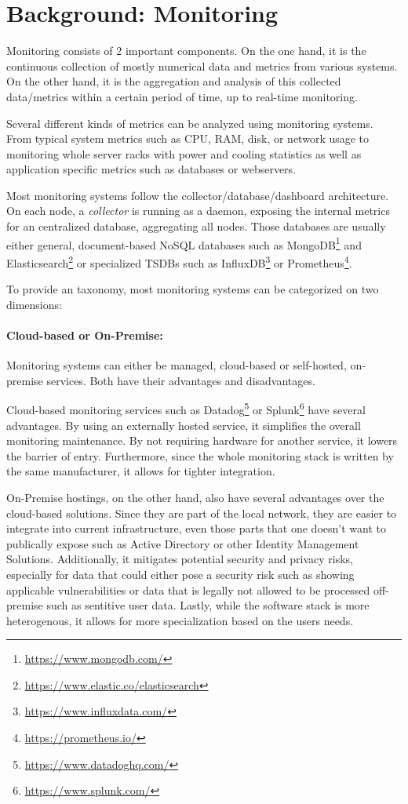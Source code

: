 \section{Background: Monitoring}
Monitoring consists of 2 important components. On the one hand, it is the continuous 
collection of mostly numerical data and metrics from various systems. On the other hand, it 
is the aggregation and analysis of this collected data/metrics within a certain period of 
time, up to real-time monitoring.

Several different kinds of metrics can be analyzed using monitoring systems. From typical
system metrics such as CPU, RAM, disk, or network usage to monitoring whole server racks
with power and cooling statistics as well as application specific metrics such as databases
or webservers.

Most monitoring systems follow the collector/database/dashboard architecture. On each node,
a \emph{collector} is running as a daemon, exposing the internal metrics for an centralized
database, aggregating all nodes. Those databases are usually either general, document-based
NoSQL databases such as MongoDB\footnote{\url{https://www.mongodb.com/}} and 
Elasticsearch\footnote{\url{https://www.elastic.co/elasticsearch}} or specialized \acp{TSDB}
such as InfluxDB\footnote{\url{https://www.influxdata.com/}} or Prometheus\footnote{
\url{https://prometheus.io/}}.

To provide an taxonomy, most monitoring systems can be categorized on two dimensions:

\paragraph{Cloud-based or On-Premise:} Monitoring systems can either be managed, cloud-based 
or self-hosted, on-premise services. Both have their advantages and disadvantages.

Cloud-based monitoring services such as Datadog\footnote{\url{https://www.datadoghq.com/}}
or Splunk\footnote{\url{https://www.splunk.com/}} have several advantages. By using an 
externally hosted service, it simplifies the overall monitoring maintenance. By not requiring
hardware for another service, it lowers the barrier of entry. Furthermore, since the whole
monitoring stack is written by the same manufacturer, it allows for tighter integration.

On-Premise hostings, on the other hand, also have several advantages over the cloud-based 
solutions. Since they are part of the local network, they are easier to integrate into current
infrastructure, even those parts that one doesn't want to publically expose such as Active 
Directory or other Identity Management Solutions. Additionally, it mitigates potential security and privacy risks, especially for data
that could either pose a security risk such as showing applicable vulnerabilities or data that is
legally not allowed to be processed off-premise such as sentitive user data. Lastly, while the 
software stack is more heterogenous, it allows for more specialization based on the users needs.

